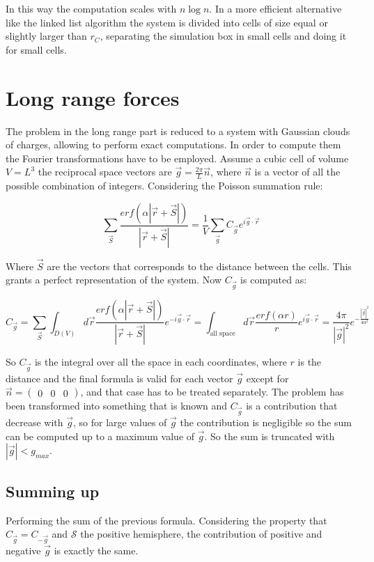 	In this way the computation scales with $n\log n$.
	In a more efficient alternative like the linked list algorithm the system is divided into cells of size equal or slightly larger than $r_C$, separating the simulation box in small cells and doing it for small cells.

\section{Long range forces}
The problem in the long range part is reduced to a system with Gaussian clouds of charges, allowing to perform exact computations.
In order to compute them the Fourier transformations have to be employed.
Assume a cubic cell of volume $V = L^3$ the reciprocal space vectors are $\vec{g} = \frac{2\pi}{L}\vec{n}$, where $\vec{n}$ is a vector of all the possible combination of integers.
Considering the Poisson summation rule:

$$\sum\limits_{\vec{S}}\frac{erf(\alpha|\vec{r} + \vec{S}|)}{|\vec{r}+\vec{S}|} = \frac{1}{V}\sum\limits_{\vec{g}}C_{\vec{g}}e^{i\vec{g}\cdot\vec{r}}$$

Where $\vec{S}$ are the vectors that corresponds to the distance between the cells.
This grants a perfect representation of the system.
Now $C_{\vec{g}}$ is computed as:

$$C_{\vec{g}} = \sum\limits_{\vec{S}}\int_{D(V)} d\vec{r}\frac{erf(\alpha|\vec{r}+\vec{S}|)}{|\vec{r}+\vec{S}|}e^{-i\vec{g}\cdot\vec{r}} = \int_{\text{all space}}d\vec{r}\frac{erf(\alpha r)}{r}e^{i\vec{g}\cdot\vec{r}} = \frac{4\pi}{|\vec{g}|^2}e^{-\frac{|\vec{g}|^2}{4\alpha^2}}$$

So $C_{\vec{g}}$ is the integral over all the space in each coordinates, where $r$ is the distance and the final formula is valid for each vector $\vec{g}$ except for $\vec{n} = \begin{pmatrix} 0&0&0\end{pmatrix}$, and that case has to be treated separately.
The problem has been transformed into something that is known and $C_{\vec{g}}$ is a contribution that decrease with $\vec{g}$, so for large values of $\vec{g}$ the contribution is negligible so the sum can be computed up to a maximum value of $\vec{g}$.
So the sum is truncated with $|\vec{g}|<g_{max}$.

	\subsection{Summing up}
	Performing the sum of the previous formula.
	Considering the property that $C_{\vec{g}} = C_{-\vec{g}}$ and $\mathcal{S}$ the positive hemisphere, the contribution of positive and negative $\vec{g}$ is exactly the same.

